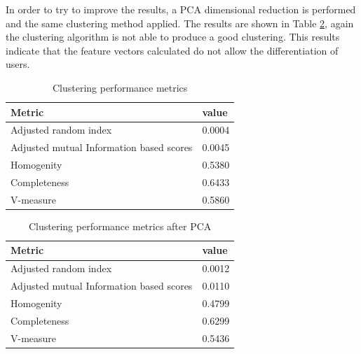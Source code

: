 \documentclass[11pt, oneside]{article}   	%
\begin{document}
In order to try to improve the results, a PCA dimensional reduction is performed and the same clustering method applied. The results are shown in Table \ref{table:featureVectorsKMeansPCA}, again the clustering algorithm is not able to produce a good clustering. This results indicate that the feature vectors calculated do not allow the differentiation of users.
\begin{table}[h!]
	\centering
	\begin{tabular}{| l | l |}
		\hline
		 \textbf{Metric} & \textbf{value} \\ \hline 
		 Adjusted random index & 0.0004 \\ \hline
		 Adjusted mutual Information based scores & 0.0045 \\ \hline
		 Homogenity & 0.5380 \\ \hline
		 Completeness & 0.6433\\ \hline
		 V-measure & 0.5860\\ \hline
	\end{tabular}
	\caption{Clustering performance metrics}
	\label{table:featureVectorsKMeans}
\end{table}
\begin{table}[h!]
	\centering
	\begin{tabular}{| l | l |}
		\hline
		 \textbf{Metric} & \textbf{value} \\ \hline
		 Adjusted random index & 0.0012 \\ \hline
		 Adjusted mutual Information based scores & 0.0110 \\ \hline
		 Homogenity & 0.4799 \\ \hline
		 Completeness & 0.6299\\ \hline
		 V-measure & 0.5436\\ \hline
	\end{tabular}
	\caption{Clustering performance metrics after PCA}
	\label{table:featureVectorsKMeansPCA}
\end{table}
\end{document}

